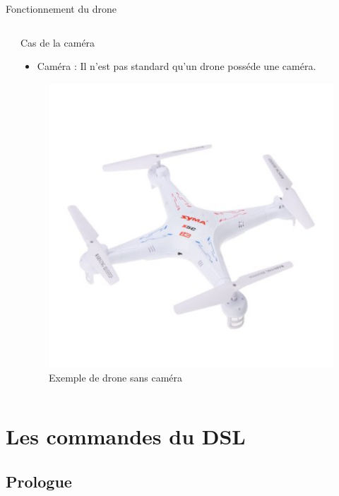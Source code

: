 \documentclass{bredelebeamer}
\begin{document}
\begin{frame}{Fonctionnement du drone}
\begin{columns}
\begin{column}{0.65\textwidth}
\end{column}
\begin{column}{0.35\textwidth}
\begin{alertblock}{Cas de la caméra}
\begin{itemize}
\item Caméra : Il n’est pas standard qu’un drone posséde une caméra.
\end{itemize}
\end{alertblock}
\begin{figure}
\centering
\includegraphics[scale=0.20]{images/img3.jpeg}
\caption{Exemple de drone sans caméra}
\end{figure}
\vspace{15px}
\end{column}
\end{columns}
\end{frame}

\section{Les commandes du DSL}
	\subsection{Prologue}
\end{document}
